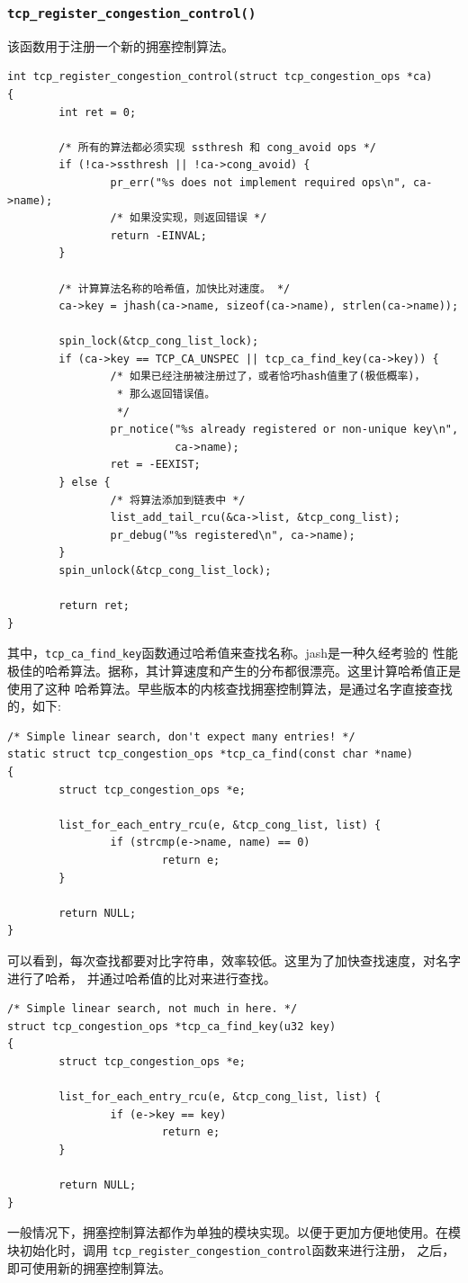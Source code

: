 		\subsubsection{\texttt{tcp_register_congestion_control()}}
			该函数用于注册一个新的拥塞控制算法。
\begin{verbatim}
int tcp_register_congestion_control(struct tcp_congestion_ops *ca)
{
        int ret = 0;

        /* 所有的算法都必须实现 ssthresh 和 cong_avoid ops */
        if (!ca->ssthresh || !ca->cong_avoid) {
                pr_err("%s does not implement required ops\n", ca->name);
                /* 如果没实现，则返回错误 */
                return -EINVAL;
        }

        /* 计算算法名称的哈希值，加快比对速度。 */
        ca->key = jhash(ca->name, sizeof(ca->name), strlen(ca->name));

        spin_lock(&tcp_cong_list_lock);
        if (ca->key == TCP_CA_UNSPEC || tcp_ca_find_key(ca->key)) {
                /* 如果已经注册被注册过了，或者恰巧hash值重了(极低概率)，
                 * 那么返回错误值。
                 */
                pr_notice("%s already registered or non-unique key\n",
                          ca->name);
                ret = -EEXIST;
        } else {
                /* 将算法添加到链表中 */
                list_add_tail_rcu(&ca->list, &tcp_cong_list);
                pr_debug("%s registered\n", ca->name);
        }
        spin_unlock(&tcp_cong_list_lock);

        return ret;
}
\end{verbatim}
	其中，\texttt{tcp_ca_find_key}函数通过哈希值来查找名称。jash是一种久经考验的
	性能极佳的哈希算法。据称，其计算速度和产生的分布都很漂亮。这里计算哈希值正是使用了这种
	哈希算法。早些版本的内核查找拥塞控制算法，是通过名字直接查找的，如下:
\begin{verbatim}
/* Simple linear search, don't expect many entries! */
static struct tcp_congestion_ops *tcp_ca_find(const char *name)
{
        struct tcp_congestion_ops *e;

        list_for_each_entry_rcu(e, &tcp_cong_list, list) {
                if (strcmp(e->name, name) == 0)
                        return e;
        }

        return NULL;
}
\end{verbatim}
	可以看到，每次查找都要对比字符串，效率较低。这里为了加快查找速度，对名字进行了哈希，
	并通过哈希值的比对来进行查找。
\begin{verbatim}
/* Simple linear search, not much in here. */
struct tcp_congestion_ops *tcp_ca_find_key(u32 key)
{
        struct tcp_congestion_ops *e;

        list_for_each_entry_rcu(e, &tcp_cong_list, list) {
                if (e->key == key)
                        return e;
        }

        return NULL;
}
\end{verbatim}
	一般情况下，拥塞控制算法都作为单独的模块实现。以便于更加方便地使用。在模块初始化时，调用
	\texttt{tcp_register_congestion_control}函数来进行注册，
	之后，即可使用新的拥塞控制算法。

